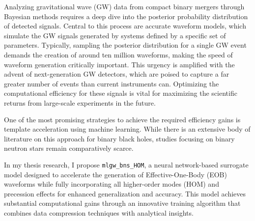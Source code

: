 Analyzing gravitational wave (GW) data from compact binary mergers through Bayesian methods requires a deep dive into the posterior probability distribution of detected signals. Central to this process are accurate waveform models, which simulate the GW signals generated by systems defined by a specific set of parameters. Typically, sampling the posterior distribution for a single GW event demands the creation of around ten million waveforms, making the speed of waveform generation critically important. This urgency is amplified with the advent of next-generation GW detectors, which are poised to capture a far greater number of events than current instruments can. Optimizing the computational efficiency for these signals is vital for maximizing the scientific returns from large-scale experiments in the future.

One of the most promising strategies to achieve the required efficiency gains is template acceleration using machine learning. While there is an extensive body of literature on this approach for binary black holes, studies focusing on binary neutron stars remain comparatively scarce.

In my thesis research, I propose \texttt{mlgw\_bns\_HOM}, a neural network-based surrogate model designed to accelerate the generation of Effective-One-Body (EOB) waveforms while fully incorporating all higher-order modes (HOM) and precession effects for enhanced generalization and accuracy. This model achieves substantial computational gains through an innovative training algorithm that combines data compression techniques with analytical insights.